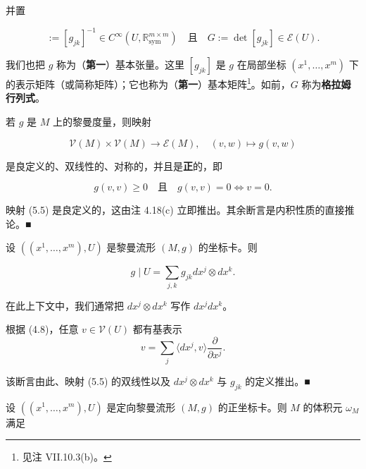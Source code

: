 并置

\begin{equation}
[g^{jk}] := [g_{jk}]^{-1} \in C^{\infty}(U, \mathbb{R}^{m \times m}_{\mathrm{sym}}) \quad \text{且} \quad G := \det[g_{jk}] \in \mathcal{E}(U) .\tag{5.4}
\end{equation}

我们也把 $ g $ 称为（\textbf{第一}）基本张量。这里 $ [g_{jk}] $ 是 $ g $ 在局部坐标 $ (x^{1}, \ldots, x^{m}) $ 下的表示矩阵（或简称矩阵）；它也称为（\textbf{第一}）基本矩阵\footnote{见注 VII.10.3(b)。}。如前，$ G $ 称为\textbf{格拉姆行列式}。

\begin{remark}

\begin{items}
\item

若 $ g $ 是 $ M $ 上的黎曼度量，则映射

\begin{equation}
\mathcal{V}(M) \times \mathcal{V}(M) \to \mathcal{E}(M) , \quad (v, w) \mapsto g(v, w)\tag{5.5}
\end{equation}

是良定义的、双线性的、对称的，并且是\textbf{正}的，即

\begin{equation}
g(v, v) \ge 0 \quad \text{且} \quad g(v, v) = 0 \iff v = 0 .\tag{5.6}
\end{equation}

\proofhead
映射 (5.5) 是良定义的，这由注 4.18(c) 立即推出。其余断言是内积性质的直接推论。\nobreak\hspace{0.35em}■
\item

设 $ ((x^{1}, \ldots, x^{m}), U) $ 是黎曼流形 $ (M, g) $ 的坐标卡。则

\[
g \mid U = \sum_{j,k} g_{jk} dx^{j} \otimes dx^{k} .
\]

在此上下文中，我们通常把 $ dx^{j} \otimes dx^{k} $ 写作 $ dx^{j}dx^{k} $。

\proofhead
根据 (4.8)，任意 $ v \in \mathcal{V}(U) $ 都有基表示
\[
v = \sum_{j} \langle dx^{j}, v \rangle \frac{\partial}{\partial x^{j}} .
\]

该断言由此、映射 (5.5) 的双线性以及 $ dx^{j} \otimes dx^{k} $ 与 $ g_{jk} $ 的定义推出。\nobreak\hspace{0.35em}■

\item

设 $ ((x^{1}, \ldots, x^{m}), U) $ 是定向黎曼流形 $ (M, g) $ 的正坐标卡。则 $ M $ 的体积元 $ \omega_{M} $ 满足


\end{items}
\end{remark}
